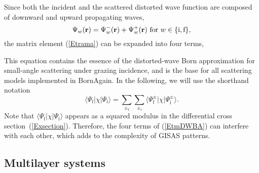 Since both the incident
and the scattered distorted wave function
are composed of downward and upward propagating waves,
\begin{equation}
  \Psi_w(\mathbf{r})
  = \Psi^-_w(\mathbf{r}) + \Psi^+_w(\mathbf{r})\text{~for~}w\in\{\text{i},\text{f}\},
\end{equation}
the matrix element (\ref{Etrama})
can be expanded into four terms,

This equation contains the essence of
the distorted-wave Born approximation
for small-angle scattering under grazing incidence,
and is the base for all scattering models implemented in BornAgain.
In the following, we will use the shorthand notation
\begin{equation}\label{EtmDWBAsum}
  \langle \Psi_\text{f}|\chi|\Psi_\text{i}\rangle
  = \sum_{\pm_\text{f}} \sum_{\pm_\text{i}}
    \langle \Psi^\pm_\text{f}|\chi|\Psi^\pm_\text{i}\rangle.
\end{equation}
Note that $\langle \Psi_\text{f}|\chi|\Psi_\text{i}\rangle$
appears as a squared modulus
in the differential cross section~(\ref{Exsection}).
Therefore, the four terms of (\ref{EtmDWBA}) can interfere with each other,
which adds to the complexity of GISAS patterns.


\subsection{Multilayer systems}

